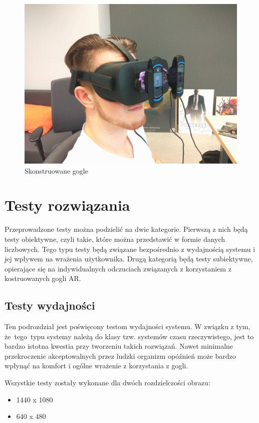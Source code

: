 \documentclass[a4paper,11pt,twoside]{report}
\theoremstyle{definition}
\begin{document}
\begin{figure}[H]
\centering
\includegraphics[scale=0.2]{images/googleWithCameras}
\caption[Skonstruowane gogle]{Skonstruowane gogle}
\end{figure}

\section{Testy rozwiązania}
Przeprowadzone testy można podzielić na dwie kategorie. Pierwszą z nich będą testy obiektywne, czyli takie, które można przedstawić w formie danych liczbowych. Tego typu testy będą związane bezpośrednio z wydajnością systemu i jej wpływem na wrażenia użytkownika. Drugą kategorią będą testy subiektywne, opierające się na indywidualnych odczuciach związanych z korzystaniem z kostruowanych gogli AR. 

\subsection{Testy wydajności}
Ten podrozdział jest poświęcony testom wydajności systemu. W związku z tym, że~tego~typu systemy należą do klasy tzw. systemów czasu rzeczywistego, jest to bardzo istotna kwestia przy tworzeniu takich rozwiązań. Nawet minimalne przekroczenie akceptowalnych przez ludzki organizm opóźnień może bardzo wpłynąć na komfort i ogólne wrażenie z korzystania z gogli.

Wszystkie testy zostały wykonane dla dwóch rozdzielczości obrazu:
\begin{itemize}
\item 1440 x 1080
\item 640 x 480
\end{itemize}
\end{document}
